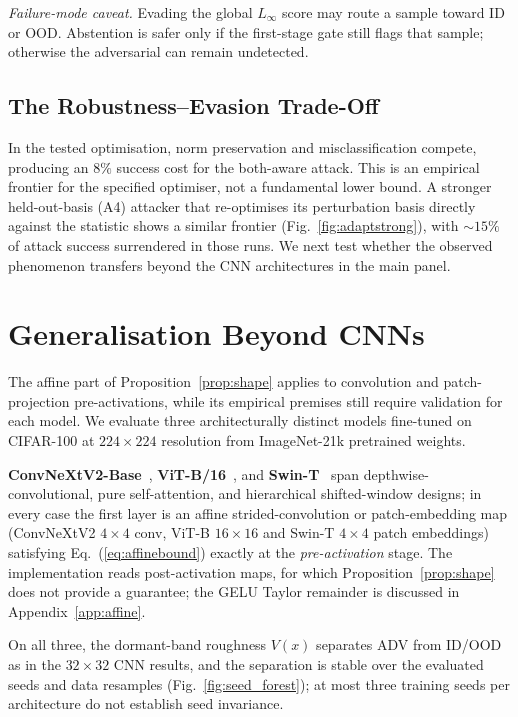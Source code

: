\documentclass[10pt,letterpaper,journal]{IEEEtran}
\begin{document}
\emph{Failure-mode caveat.} Evading the global $L_\infty$ score may route a
sample toward ID or OOD. Abstention is safer only if the first-stage gate still
flags that sample; otherwise the adversarial can remain undetected.

\subsection{The Robustness--Evasion Trade-Off}
In the tested optimisation, norm preservation and misclassification compete,
producing an $8\%$ success cost for the both-aware attack. This is an empirical
frontier for the specified optimiser, not a fundamental lower bound.
A stronger held-out-basis (A4) attacker that re-optimises its perturbation
basis directly against the statistic shows a similar frontier
(Fig.~\ref{fig:adaptstrong}), with ${\sim}15\%$ of attack success surrendered
in those runs. We next test whether the observed phenomenon transfers beyond
the CNN architectures in the main panel.



\section{Generalisation Beyond CNNs}
\label{sec:beyond_cnn}

The affine part of Proposition~\ref{prop:shape} applies to convolution and
patch-projection pre-activations, while its empirical premises still require
validation for each model. We evaluate three
architecturally distinct models fine-tuned on CIFAR-100 at $224\times224$
resolution from ImageNet-21k pretrained weights.

\textbf{ConvNeXtV2-Base}~\cite{woo2023convnext},
\textbf{ViT-B/16}~\cite{dosovitskiy2020image}, and
\textbf{Swin-T}~\cite{liu2021swin} span depthwise-convolutional, pure
self-attention, and hierarchical shifted-window designs; in every case the
first layer is an affine strided-convolution or patch-embedding map (ConvNeXtV2
$4{\times}4$ conv, ViT-B $16{\times}16$ and Swin-T $4{\times}4$ patch embeddings)
satisfying Eq.~(\ref{eq:affinebound}) exactly at the
\emph{pre-activation} stage. The implementation reads post-activation maps, for
which Proposition~\ref{prop:shape} does not provide a guarantee; the GELU
Taylor remainder is discussed in Appendix~\ref{app:affine}.

On all three, the dormant-band roughness $V(x)$ separates ADV from
ID/OOD as in the $32\times32$ CNN results, and the separation is
stable over the evaluated seeds and data resamples
(Fig.~\ref{fig:seed_forest}); at most three training seeds per architecture do
not establish seed invariance.
\end{document}
